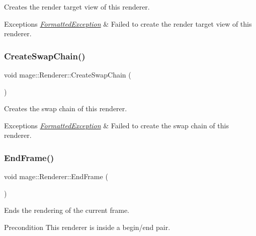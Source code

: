 Creates the render target view of this renderer.


\begin{DoxyExceptions}{Exceptions}
{\em \hyperlink{structmage_1_1_formatted_exception}{Formatted\+Exception}} & Failed to create the render target view of this renderer. \\
\hline
\end{DoxyExceptions}
\hypertarget{classmage_1_1_renderer_a1bd77bf54ea3a7867691785efd183013}{}\label{classmage_1_1_renderer_a1bd77bf54ea3a7867691785efd183013} 
\subsubsection{\texorpdfstring{Create\+Swap\+Chain()}{CreateSwapChain()}}
{\footnotesize\ttfamily void mage\+::\+Renderer\+::\+Create\+Swap\+Chain (\begin{DoxyParamCaption}{ }\end{DoxyParamCaption})\hspace{0.3cm}{\ttfamily [private]}}

Creates the swap chain of this renderer.


\begin{DoxyExceptions}{Exceptions}
{\em \hyperlink{structmage_1_1_formatted_exception}{Formatted\+Exception}} & Failed to create the swap chain of this renderer. \\
\hline
\end{DoxyExceptions}
\hypertarget{classmage_1_1_renderer_a38be3325e99a447340a048db19e6cf07}{}\label{classmage_1_1_renderer_a38be3325e99a447340a048db19e6cf07} 
\subsubsection{\texorpdfstring{End\+Frame()}{EndFrame()}}
{\footnotesize\ttfamily void mage\+::\+Renderer\+::\+End\+Frame (\begin{DoxyParamCaption}{ }\end{DoxyParamCaption})}

Ends the rendering of the current frame.

\begin{DoxyPrecond}{Precondition}
This renderer is inside a begin/end pair. 
\end{DoxyPrecond}
\hypertarget{classmage_1_1_renderer_a80cfd903143b94348bc2c0c841831ff3}{}\label{classmage_1_1_renderer_a80cfd903143b94348bc2c0c841831ff3} 
